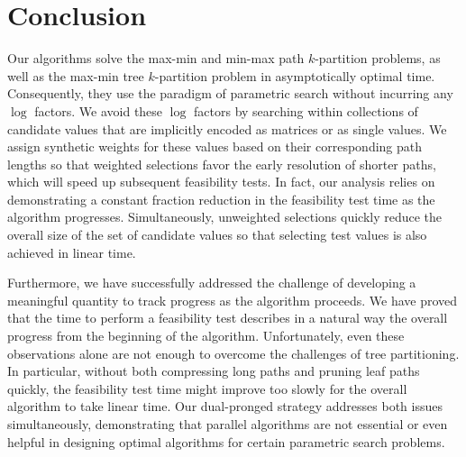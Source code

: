 \section{Conclusion}
Our algorithms solve the max-min and min-max path $k$-partition problems, as well as the max-min tree $k$-partition problem in asymptotically optimal time. 
Consequently, they use the paradigm of parametric search without incurring any $\log$ factors. 
We avoid these $\log$ factors by searching within collections of candidate values that are implicitly encoded as matrices or as single values. 
We assign synthetic weights for these values based on their corresponding path lengths so that weighted selections favor the early resolution of shorter paths, which will speed up subsequent feasibility tests. 
In fact, our analysis relies on demonstrating a constant fraction reduction in the feasibility test time as the algorithm progresses. 
Simultaneously, unweighted selections quickly reduce the overall size of the set of candidate values so that selecting test values is also achieved in linear time. 

Furthermore, we have successfully addressed the challenge of developing a meaningful quantity to track progress as the algorithm proceeds. 
We have proved that the time to perform a feasibility test describes in a natural way the overall progress from the beginning of the algorithm. 
Unfortunately, even these observations alone are not enough to overcome the challenges of tree partitioning. 
In particular, without both compressing long paths and pruning leaf paths quickly, the feasibility test time might improve too slowly for the overall algorithm to take linear time. 
Our dual-pronged strategy addresses both issues simultaneously, demonstrating that parallel algorithms are not essential or even helpful in designing optimal algorithms for certain parametric search problems.